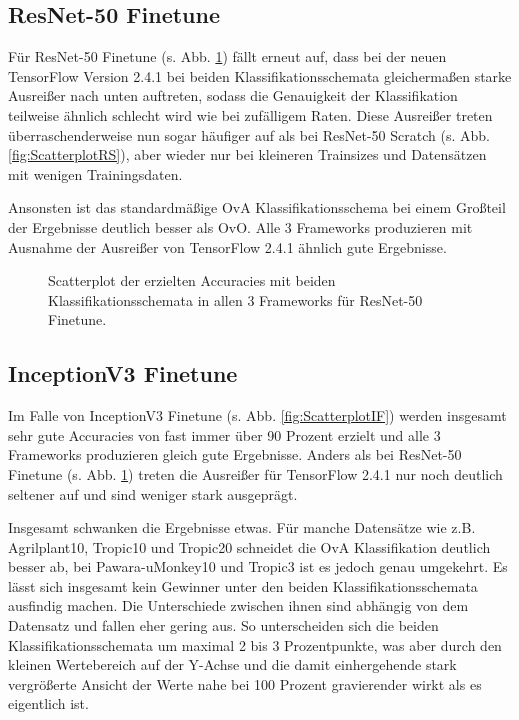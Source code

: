 \subsection{ResNet-50 Finetune}
Für ResNet-50 Finetune (s. Abb. \ref{fig:ScatterplotRF}) fällt erneut auf, dass bei der neuen TensorFlow Version 2.4.1 \cite{tensorflow} bei beiden Klassifikationsschemata gleichermaßen starke Ausreißer nach unten auftreten, sodass die Genauigkeit der Klassifikation teilweise ähnlich schlecht wird wie bei zufälligem Raten. Diese Ausreißer treten überraschenderweise nun sogar häufiger auf als bei ResNet-50 Scratch (s. Abb. \ref{fig:ScatterplotRS}), aber wieder nur bei kleineren Trainsizes und Datensätzen mit wenigen Trainingsdaten.

Ansonsten ist das standardmäßige OvA Klassifikationsschema bei einem Großteil der Ergebnisse deutlich besser als OvO. Alle 3 Frameworks produzieren mit Ausnahme der Ausreißer von TensorFlow 2.4.1 \cite{tensorflow} ähnlich gute Ergebnisse.
\begin{figure}[H]
\hspace*{-1.5cm}

\caption{Scatterplot der erzielten Accuracies mit beiden Klassifikationsschemata in allen 3 Frameworks für ResNet-50 Finetune.}
\label{fig:ScatterplotRF}
\end{figure}
\newpage
\subsection{InceptionV3 Finetune}
Im Falle von InceptionV3 Finetune (s. Abb. \ref{fig:ScatterplotIF}) werden insgesamt sehr gute Accuracies von fast immer über 90 Prozent erzielt und alle 3 Frameworks produzieren gleich gute Ergebnisse. Anders als bei ResNet-50 Finetune (s. Abb. \ref{fig:ScatterplotRF}) treten die Ausreißer für TensorFlow 2.4.1 \cite{tensorflow} nur noch deutlich seltener auf und sind weniger stark ausgeprägt.

Insgesamt schwanken die Ergebnisse etwas. Für manche Datensätze wie z.B. Agrilplant10, Tropic10 und Tropic20 schneidet die OvA Klassifikation deutlich besser ab, bei Pawara-uMonkey10 und Tropic3 ist es jedoch genau umgekehrt.
Es lässt sich insgesamt kein Gewinner unter den beiden Klassifikationsschemata ausfindig machen. Die Unterschiede zwischen ihnen sind abhängig von dem Datensatz und fallen eher gering aus. So unterscheiden sich die beiden Klassifikationsschemata um maximal 2 bis 3 Prozentpunkte, was aber durch den kleinen Wertebereich auf der Y-Achse und die damit einhergehende stark vergrößerte Ansicht der Werte nahe bei 100 Prozent gravierender wirkt als es eigentlich ist.

